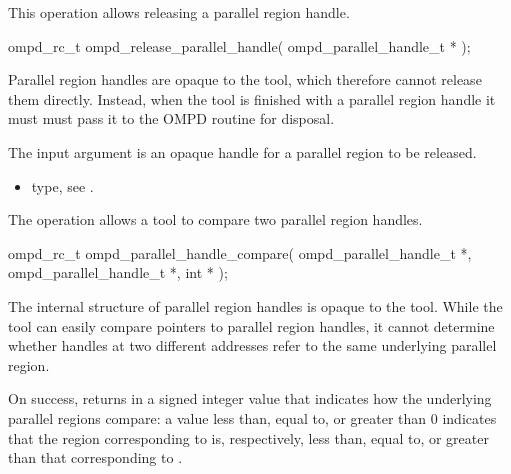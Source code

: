 \label{subsubsubsec:ompd_release_parallel_handle}
\summary
This operation allows releasing a parallel region handle.

\format

\begin{cspecific}
\begin{ompSyntax}
ompd_rc_t ompd_release_parallel_handle(
  ompd_parallel_handle_t *
);
\end{ompSyntax}
\end{cspecific}


\descr
Parallel region handles are opaque to the tool, which therefore
cannot release them directly. Instead, when the tool is finished with a parallel region handle
it must must pass it to the OMPD 
routine for disposal.

\argdesc
The input argument  is an opaque handle for a parallel region
to be released.

\crossreferences
\begin{itemize}
	\item {} type, see .
\end{itemize}

\label{subsubsubsec:ompd_parallel_handle_compare}
\summary
The  operation allows a tool to compare two 
parallel region handles.

\format

\begin{cspecific}
\begin{ompSyntax}
ompd_rc_t ompd_parallel_handle_compare(
  ompd_parallel_handle_t *,
  ompd_parallel_handle_t *,
  int *
);
\end{ompSyntax}
\end{cspecific}


\descr
The internal structure of parallel region handles is opaque to the tool. While the tool can easily 
compare pointers to parallel region handles, it cannot determine whether handles at two different 
addresses refer to the same underlying parallel region.

On success,  returns in  a signed 
integer value that indicates how the underlying parallel regions compare: a value less than, equal 
to, or greater than 0 indicates that the region corresponding to  is,
respectively, less than, equal to, or greater than that corresponding to .

